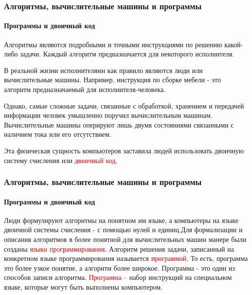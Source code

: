 \documentclass[aspectratio=169]{beamer}
\begin{document}
\begin{frame}
\frametitle{Алгоритмы, вычислительные машины и программы}
\framesubtitle{Программы и двоичный код}
\justifying

Алгоритмы являются подробными и точными инструкциями по решению какой-либо задачи. Каждый алгоритм предназначается для некоторого исполнителя.\newline

 В реальной жизни исполнителями как правило являются люди или вычислительные машины. Например, инструкция по сборке мебели - это алгоритм предназначаемый для исполнителя-человека.\newline

Однако, самые сложные задачи, связанные с обработкой, хранением и передачей информации  человек умышленно поручил вычислительным машинам.
Вычислительные машины оперируют лишь двумя состояниями связанными с наличием тока или его отсутствием.\newline

Эта физическая сущность компьютеров заставила людей использовать двоичную систему счисления или \textcolor{red}{двоичный код}.

\end{frame}

\begin{frame}
\frametitle{Алгоритмы, вычислительные машины и программы}
\framesubtitle{Программы и двоичный код}
\justifying

Люди формулируют алгоритмы на понятном им языке, а компьютеры на языке двоичной системы счисления - с помощью нулей и единиц.\newline\newline Для формализации и описания алгоритмов в более понятной для вычислительных машин манере были созданы \textcolor{red}{языки программирования}.\newline\newline 
Алгоритм решения задачи, записанный на конкретном языке программирования называется \textcolor{red}{программой}. То есть, программа это более узкое понятие, а алгоритм более широкое. Программа - это один из способов записи алгоритма. \newline\newline 
\textcolor{red}{Программа} – набор инструкций на специальном языке, которые могут быть выполнены компьютером.

\end{frame}
\end{document}
